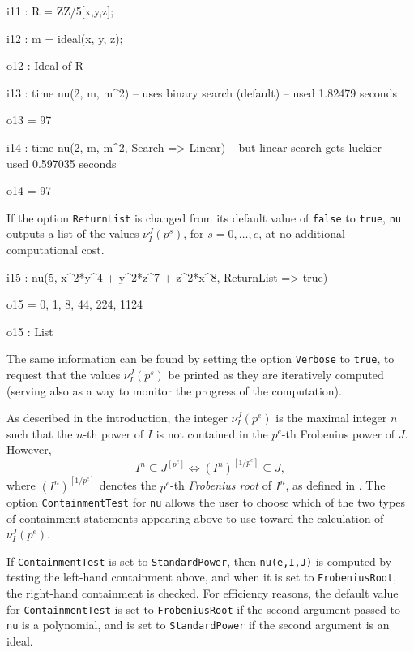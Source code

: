 \documentclass{amsart}
\begin{document}
\smallskip
{\small
{}
\begin{MyVerbatim}
i11 : R = ZZ/5[x,y,z];

i12 : m = ideal(x, y, z);

o12 : Ideal of R

i13 : time nu(2, m, m^2) -- uses binary search (default)
     -- used 1.82479 seconds

o13 = 97

i14 : time nu(2, m, m^2, Search => Linear) -- but linear search gets luckier
     -- used 0.597035 seconds

o14 = 97
\end{MyVerbatim}
}
\smallskip

If the option \texttt{ReturnList} is changed from its default value of \texttt{false} to \texttt{true}, \texttt{nu} outputs a list of the values $\nu_I^J(p^s)$, for $s=0,\ldots,e$, at no additional computational cost.

\smallskip
{\small
{}
\begin{MyVerbatim}
i15 : nu(5, x^2*y^4 + y^2*z^7 + z^2*x^8, ReturnList => true)

o15 = {0, 1, 8, 44, 224, 1124}

o15 : List
\end{MyVerbatim}
}
\smallskip

\noindent The same information can be found by setting the option \texttt{Verbose} to \texttt{true}, to request that the values $\nu_I^J(p^s)$ be printed as they are iteratively computed (serving also as a way to monitor the progress of the computation).

As described in the introduction, the integer $\nu_I^J(p^e)$ is the maximal integer $n$ such that the $n$-th power of $I$ is not contained in the $p^e$-th Frobenius power of $J$.  However,
\begin{equation*}
  I^n \subseteq J^{[p^e]} \Longleftrightarrow (I^n)^{[1/p^e]} \subseteq J,
\end{equation*}
where $(I^n)^{[1/p^e]}$ denotes the $p^e$-th \emph{Frobenius root} of $I^n$, as defined in \cite{BlickleMustataSmithDiscretenessAndRationalityOfFThresholds}.
The option \texttt{ContainmentTest} for \texttt{nu} allows the user to choose which of the two types of containment statements appearing above to use toward the calculation of $\nu_I^J(p^e)$.

If \texttt{ContainmentTest} is set to \texttt{StandardPower}, then \texttt{nu(e,I,J)} is computed by testing the left-hand containment above, and when it is set to \texttt{FrobeniusRoot}, the right-hand containment is checked.
For efficiency reasons, the default value for \texttt{ContainmentTest} is set to  \texttt{FrobeniusRoot} if the second argument passed to \texttt{nu} is a polynomial, and is set to \texttt{StandardPower} if the second argument is an ideal.
\end{document}
